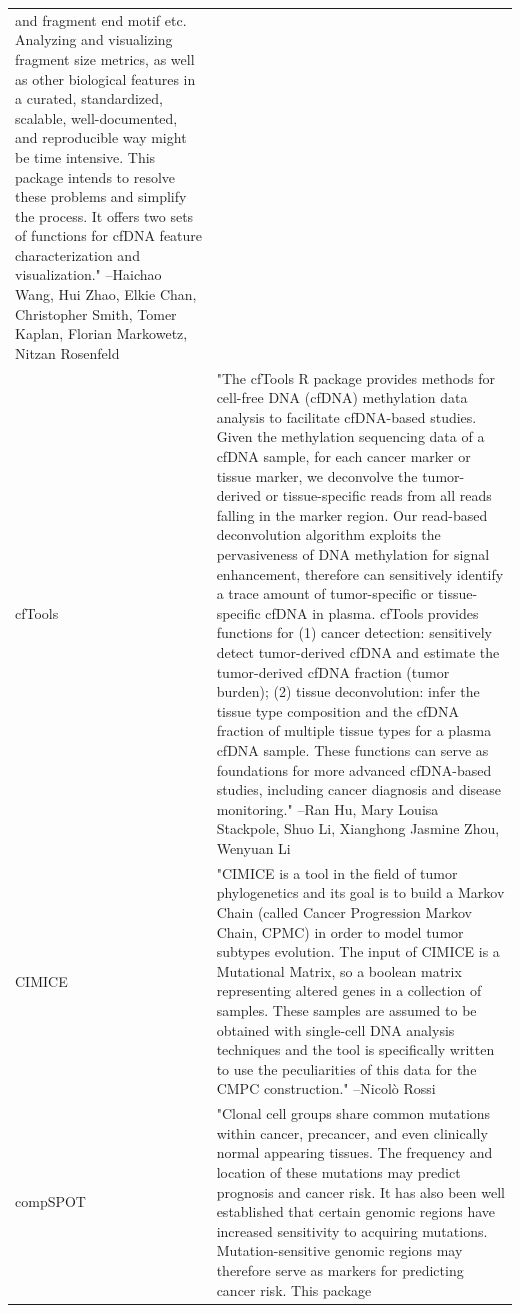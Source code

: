 \begin{longtable}[t]{l>{\raggedright\arraybackslash}p{25em}}
and fragment end motif etc. Analyzing and visualizing fragment
size metrics, as well as other biological features in a
curated, standardized, scalable, well-documented, and
reproducible way might be time intensive. This package intends
to resolve these problems and simplify the process. It offers
two sets of functions for cfDNA feature characterization and
visualization." --Haichao Wang, Hui Zhao, Elkie Chan, Christopher Smith, Tomer Kaplan, Florian Markowetz, Nitzan Rosenfeld\\
cfTools & "The cfTools R package provides methods for cell-free DNA
(cfDNA) methylation data analysis to facilitate cfDNA-based
studies. Given the methylation sequencing data of a cfDNA
sample, for each cancer marker or tissue marker, we deconvolve
the tumor-derived or tissue-specific reads from all reads
falling in the marker region. Our read-based deconvolution
algorithm exploits the pervasiveness of DNA methylation for
signal enhancement, therefore can sensitively identify a trace
amount of tumor-specific or tissue-specific cfDNA in plasma.
cfTools provides functions for (1) cancer detection:
sensitively detect tumor-derived cfDNA and estimate the
tumor-derived cfDNA fraction (tumor burden); (2) tissue
deconvolution: infer the tissue type composition and the cfDNA
fraction of multiple tissue types for a plasma cfDNA sample.
These functions can serve as foundations for more advanced
cfDNA-based studies, including cancer diagnosis and disease
monitoring." --Ran Hu, Mary Louisa Stackpole, Shuo Li, Xianghong Jasmine Zhou, Wenyuan Li\\
CIMICE & "CIMICE is a tool in the field of tumor phylogenetics and
its goal is to build a Markov Chain (called Cancer Progression
Markov Chain, CPMC) in order to model tumor subtypes evolution.
The input of CIMICE is a Mutational Matrix, so a boolean matrix
representing altered genes in a collection of samples. These
samples are assumed to be obtained with single-cell DNA
analysis techniques and the tool is specifically written to use
the peculiarities of this data for the CMPC construction." --Nicolò Rossi\\
compSPOT & "Clonal cell groups share common mutations within cancer,
precancer, and even clinically normal appearing tissues. The
frequency and location of these mutations may predict prognosis
and cancer risk. It has also been well established that certain
genomic regions have increased sensitivity to acquiring
mutations. Mutation-sensitive genomic regions may therefore
serve as markers for predicting cancer risk. This package

\end{longtable}
